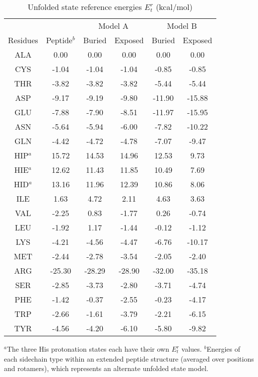 \documentclass[12pt]{article}
\begin{document}
\begin{table}[h]
\caption{Unfolded state reference energies $E_t^r$ (kcal/mol)}
\label{tab:Eref}                      
\begin{center}
\begin{tabular}{cccccc} \hline \hline
    &        & \multicolumn{2}{c}{\hrulefill Model A \hrulefill} & \multicolumn{2}{c}{\hrulefill Model B \hrulefill} \\
Residues & Peptide$^b$ & Buried & Exposed & Buried & Exposed \\ \hline
ALA &   0.00 &   0.00 &   0.00  &   0.00 &   0.00 \\
CYS &  -1.04 &  -1.04 &  -1.04  &  -0.85 &  -0.85 \\
THR &  -3.82 &  -3.82 &  -3.82  &  -5.44 &  -5.44 \\
ASP &  -9.17 &  -9.19 &  -9.80  & -11.90 & -15.88 \\
GLU &  -7.88 &  -7.90 &  -8.51  & -11.97 & -15.95 \\
ASN &  -5.64 &  -5.94 &  -6.00  &  -7.82 & -10.22 \\
GLN &  -4.42 &  -4.72 &  -4.78  &  -7.07 &  -9.47 \\
HIP$^a$ &  15.72 &  14.53 &  14.96  &  12.53 &   9.73 \\
HIE$^a$ &  12.62 &  11.43 &  11.85  &  10.49 &   7.69 \\
HID$^a$ &  13.16 &  11.96 &  12.39  &  10.86 &   8.06 \\
ILE &   1.63 &   4.72 &   2.11  &   4.63 &   3.63 \\
VAL &  -2.25 &   0.83 &  -1.77  &   0.26 &  -0.74 \\
LEU &  -1.92 &   1.17 &  -1.44  &  -0.12 &  -1.12 \\
LYS &  -4.21 &  -4.56 &  -4.47  &  -6.76 & -10.17 \\
MET &  -2.44 &  -2.78 &  -3.54  &  -2.05 &  -2.40 \\
ARG & -25.30 & -28.29 & -28.90  & -32.00 & -35.18 \\
SER &  -2.85 &  -3.73 &  -2.80  &  -3.71 &  -4.74 \\
PHE &  -1.42 &  -0.37 &  -2.55  &  -0.23 &  -4.17 \\
TRP &  -2.66 &  -1.61 &  -3.79  &  -2.21 &  -6.15 \\
TYR &  -4.56 &  -4.20 &  -6.10  &  -5.80 &  -9.82 \\ \hline
\end{tabular}
\end{center}
{\small \noindent $^a$The three His protonation states each have their own $E_t^r$ values.
$^b$Energies of each sidechain type within an extended peptide structure (averaged over positions and rotamers),
which represents an alternate unfolded state model.
}
\end{table}
\end{document}
